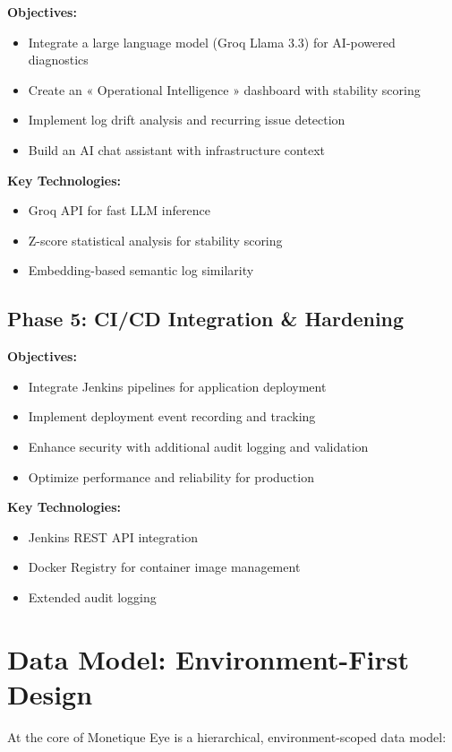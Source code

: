 \documentclass[12pt,a4paper]{report}
\begin{document}
\textbf{Objectives:}
\begin{itemize}
  \item Integrate a large language model (Groq Llama 3.3) for AI-powered diagnostics
  \item Create an « Operational Intelligence » dashboard with stability scoring
  \item Implement log drift analysis and recurring issue detection
  \item Build an AI chat assistant with infrastructure context
\end{itemize}

\textbf{Key Technologies:}
\begin{itemize}
  \item Groq API for fast LLM inference
  \item Z-score statistical analysis for stability scoring
  \item Embedding-based semantic log similarity
\end{itemize}

\subsection{Phase 5: CI/CD Integration \& Hardening}

\textbf{Objectives:}
\begin{itemize}
  \item Integrate Jenkins pipelines for application deployment
  \item Implement deployment event recording and tracking
  \item Enhance security with additional audit logging and validation
  \item Optimize performance and reliability for production
\end{itemize}

\textbf{Key Technologies:}
\begin{itemize}
  \item Jenkins REST API integration
  \item Docker Registry for container image management
  \item Extended audit logging
\end{itemize}

\section{Data Model: Environment-First Design}

At the core of Monetique Eye is a hierarchical, environment-scoped data model:
\end{document}
